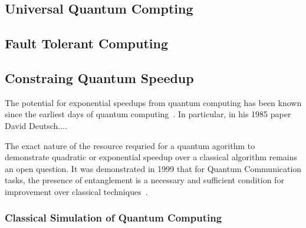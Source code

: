 \documentclass{standalone}
\begin{document}
\subsection{Universal Quantum Compting}
\subsection{Fault Tolerant Computing}
\subsection{Constraing Quantum Speedup}

The potential for exponential speedups from quantum computing has been known since the earliest days of quantum computing~\cite{Jozsa2003}. In particular, in his 1985 paper David Deutsch....

The exact nature of the resource requried for a quantum agorithm to demonstrate quadratic or exponential speedup over a classical algorithm remains an open question. 
It was demonstrated in 1999 that for Quantum Communication tasks, the presence of entanglement is a necessary and sufficient condition for improvement over classical techniques~\cite{Raz1999}.

\subsubsection{Classical Simulation of Quantum Computing} 

\ifstandalone

\fi
\end{document}
